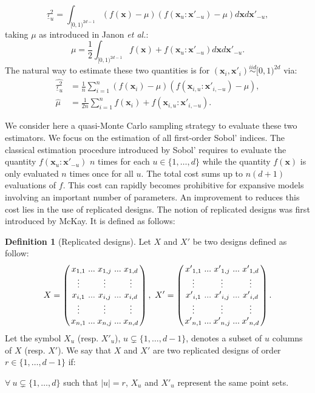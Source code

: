 \documentclass[]{elsarticle}
\theoremstyle{definition}
\newtheorem{defin}{Definition}
\newcommand{\bvec}[1]{\boldsymbol{#1}}
\newcommand{\vx}{\bvec{x}}
\begin{document}
\[\underline{\tau}_u^2  =\int_{[0,1)^{2d-1}}(f(\vx) - \mu) (f(\vx_u:{\vx'}_{-u})-\mu) d\vx d{\vx'}_{-u},\]
taking $\mu$ as introduced in Janon \textit{et al.}:
\[\mu= \frac{1}{2} \int_{[0,1)^{2d-1}}f(\vx)+f(\vx_u:{\vx'}_{-u}) d\vx d{\vx'}_{-u}. \]
The natural way to estimate these two quantities is for $(\vx_i,\vx'_i) \stackrel{iid}{\sim} [0,1)^{2d}$ via:
\begin{align*}
\widehat{\underline{\tau}_u^2} & = \frac{1}{n} \sum \limits_{i=1}^n (f(\vx_i) - \mu) (f(\vx_{i,u}:{\vx'}_{i,-u})-\mu),\\
\widehat{\mu} & = \frac{1}{2n} \sum \limits_{i=1}^n f(\vx_i) +f(\vx_{i,u}:{\vx'}_{i,-u}).
\end{align*}
\bigskip

We consider here a quasi-Monte Carlo sampling strategy to evaluate these two estimators. We focus on the estimation of all first-order Sobol' indices. The classical estimation procedure introduced by Sobol' requires to evaluate the quantity $f(\vx_u:{\vx'}_{-u})$ $n$ times for each $u \in \{1,\dots,d\}$ while the quantity $f(\vx)$ is only evaluated $n$ times once for all $u$. The total cost sums up to $n(d+1)$ evaluations of $f$. This cost can rapidly becomes prohibitive for expansive models involving an important number of parameters. An improvement to reduces this cost lies in the use of replicated designs. The notion of replicated designs was first introduced by McKay. It is defined as follows:
\begin{defin}[Replicated designs]
Let $X$ and $X'$ be two designs defined as follow:
\[\arraycolsep=1.3pt
X=\left(\begin{array}{ccccc}
x_{1,1} & ... & x_{1,j} & ... & x_{1,d} \\
\vdots &  & \vdots & & \vdots \\
x_{i,1} & ... & x_{i,j} & ... & x_{i,d} \\
\vdots &  & \vdots & & \vdots \\
x_{n,1} & ... & x_{n,j} & ... & x_{n,d} \\
\end{array} \right), \ X'=\left(\begin{array}{ccccc}
{x'}_{1,1} & ... & {x'}_{1,j} & ... & {x'}_{1,d} \\
\vdots &  & \vdots & & \vdots \\
{x'}_{i,1} & ... & {x'}_{i,j} & ... & {x'}_{i,d} \\
\vdots &  & \vdots & & \vdots \\
{x'}_{n,1} & ... & {x'}_{n,j} & ... & {x'}_{n,d} \\
\end{array} \right).
\]
Let the symbol $X_u$ (resp. $X'_u$), $u \subsetneq \{1,\dots,d-1\}$, denotes a subset of $u$ columns of $X$ (resp. $X'$). We say that $X$ and $X'$ are two replicated designs of order $r \in \{1,\dots,d-1\}$ if:

$\forall \ u \subsetneq \{1,\dots,d\}$ such that $|u|=r$, $X_u$ and $X'_u$ represent the same point sets.
\end{defin}
\end{document}
